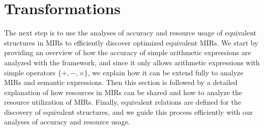 \section{Transformations}
\label{sec:transformations}

The next step is to use the analyses of accuracy and resource usage of
equivalent structures in MIRs to efficiently discover optimized equivalent
MIRs.  We start by providing an overview of how the accuracy of simple
arithmetic expressions are analyzed with the \soap{} framework, and since it
only allows arithmetic expressions with simple operators $\{+, -, \times\}$, we
explain how it can be extend fully to analyze MIRs and semantic expressions.
Then this section is followed by a detailed explanation of how resources
in MIRs can be shared and how to analyze the resource utilization of MIRs.
Finally, equivalent relations are defined for the discovery of equivalent
structures, and we guide this process efficiently with our analyses of accuracy
and resource usage.




